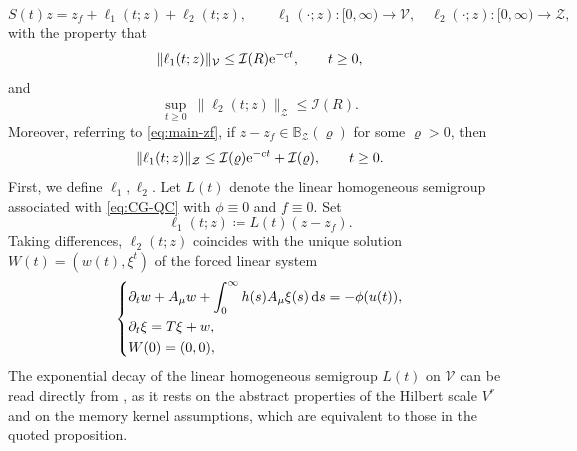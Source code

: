 \documentclass[12pt,leqno]{amsart}
\def\e{{\rm e}}
\def\d{{\rm d}}
\theoremstyle{definition}
\numberwithin{equation}{section}
\numberwithin{figure}{section}
\begin{document}
\begin{equation}\label{eq:decomp-sec7}
S(t)z = z_f+\ell_1(t;z)+\ell_2(t;z), \qquad \ell_1(\cdot;z):[0,\infty)\to\mathcal V,
\quad
\ell_2(\cdot;z):[0,\infty)\to\mathcal Z,
\end{equation}
with the property that
\begin{equation}\label{eq:ell1-decay}
\|\ell_1(t;z)\|_{\mathcal V}\le \mathcal I(R)\e^{-c t},\qquad 
 t\ge0,
\end{equation}
and
\begin{equation}\label{eq:ell2-Z-bdd}
\sup_{t\ge0}\ \|\ell_2(t;z)\|_{\mathcal Z}\le \mathcal I(R).
\end{equation}
Moreover, referring to \eqref{eq:main-zf}, if $z-z_f\in \mathbb B_{\mathcal Z}(\varrho)$ for some $\varrho>0$, then
\begin{equation}\label{eq:ell1-Z-est}
\|\ell_1(t;z)\|_{\mathcal Z}\le \mathcal I(\varrho)\e^{-c t}+\mathcal I(\varrho), \qquad
t\ge0.
\end{equation}
First, we define $\ell_1,\ell_2$.
Let $L(t)$ denote the linear homogeneous semigroup associated with
\eqref{eq:CG-QC} with $\phi\equiv0$ and $f\equiv0$.
Set
\begin{equation}\label{eq:ell1-ell2-def}
\ell_1(t;z)\coloneqq L(t)\left(z-z_f\right).
\end{equation}
Taking differences, $\ell_2(t;z)$ coincides with    the unique solution $W(t)=(w(t),\xi^t)$ of the forced linear system
\begin{equation}\label{eq:W-system-sec7}
\left\{
\begin{aligned}
&\partial_t w + A_{\mu}w + \int_0^\infty h(s)A_\mu\xi(s)\,\d s = -\phi(u(t)),\\
&\partial_t \xi = T\xi + w,\\
&W(0)=(0,0),
\end{aligned}
\right.
\end{equation}
The exponential decay of the linear homogeneous semigroup $L(t)$ on $\mathcal V$ can be read directly from
 \cite[Proposition~6.5]{CGDP2010}, as it rests on the abstract properties of the Hilbert scale $V^r$ and on the memory kernel assumptions, which are equivalent to those in the quoted proposition.
 
\end{document}
